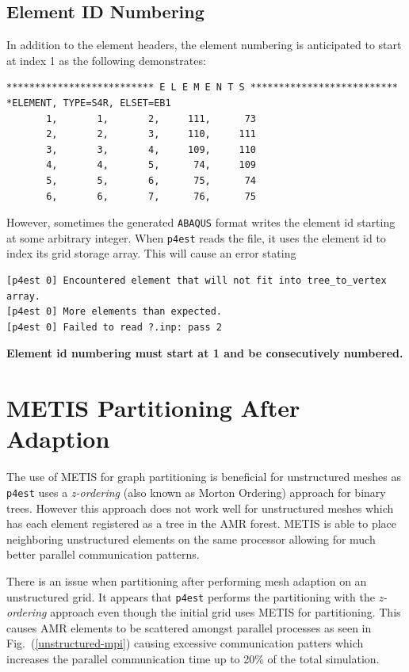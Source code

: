 \documentclass[11pt]{book}
\begin{document}
\subsection{Element ID Numbering}
In addition to the element headers, the element numbering is anticipated to start 
at index 1 as the following demonstrates:
\begin{verbatim}
************************** E L E M E N T S **************************
*ELEMENT, TYPE=S4R, ELSET=EB1
       1,       1,       2,     111,      73
       2,       2,       3,     110,     111
       3,       3,       4,     109,     110
       4,       4,       5,      74,     109
       5,       5,       6,      75,      74
       6,       6,       7,      76,      75
\end{verbatim}
However, sometimes the generated \texttt{ABAQUS} format writes the element id starting 
at some arbitrary integer. When \texttt{p4est} reads the file, it uses the element id 
to index its grid storage array. This will cause an error stating 
\begin{verbatim}
[p4est 0] Encountered element that will not fit into tree_to_vertex array. 
[p4est 0] More elements than expected.
[p4est 0] Failed to read ?.inp: pass 2
\end{verbatim}
\textbf{Element id numbering must start at 1 and be consecutively numbered.}

\newpage
\section{METIS Partitioning After Adaption}
The use of METIS for graph partitioning is beneficial for unstructured meshes 
as \texttt{p4est} uses a \textit{z-ordering} (also known as Morton Ordering) approach for binary trees. 
However this approach does not work well for unstructured meshes which has each 
element registered as a tree in the AMR forest. METIS is able to place neighboring 
unstructured elements on the same processor allowing for much better parallel communication 
patterns. 

There is an issue when partitioning after performing mesh adaption on an unstructured grid.
It appears that \texttt{p4est} performs the partitioning with the \textit{z-ordering} 
approach even though the initial grid uses METIS for partitioning. This causes AMR elements 
to be scattered amongst parallel processes as seen in Fig.~(\ref{unstructured-mpi}) 
causing excessive communication patters which increases the parallel communication 
time up to 20\% of the total simulation. 
\end{document}
